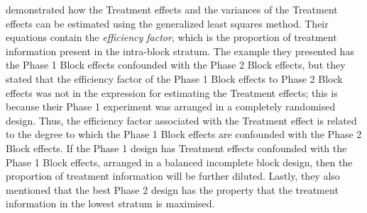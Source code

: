 \cite{Wood1988} demonstrated how the Treatment effects and the variances of the Treatment effects can be estimated using the generalized least squares method. Their equations contain the \emph{efficiency factor}, which is the proportion of treatment information present in the intra-block stratum. The example they presented has the Phase 1 Block effects confounded with the Phase 2 Block effects, but they stated that the efficiency factor of the Phase 1 Block effects to Phase 2 Block effects was not in the expression for estimating the Treatment effects; this is because their Phase 1 experiment was arranged in a completely randomised design. Thus, the efficiency factor associated with the Treatment effect is related to the degree to which the Phase 1 Block effects are confounded with the Phase 2 Block effects. If the Phase 1 design has Treatment effects confounded with the Phase 1 Block effects, arranged in a balanced incomplete block design, then the proportion of treatment information will be further diluted. Lastly, they also mentioned that the best Phase 2 design has the property that the treatment information in the lowest stratum is maximised. 



